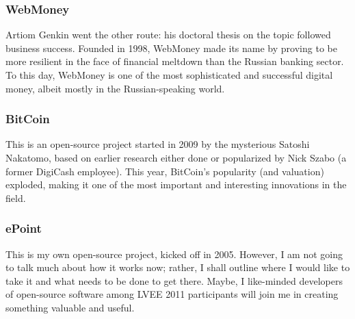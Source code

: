 \documentclass[10pt, a5paper]{article}
\begin{document}
\subsubsection*{WebMoney}
Artiom Genkin went the other route: his doctoral thesis on the topic
followed business success. Founded in 1998, WebMoney made its name by
proving to be more resilient in the face of financial meltdown than the
Russian banking sector. To this day, WebMoney is one of the most
sophisticated and successful digital money, albeit mostly in the
Russian-speaking world.

\subsubsection*{BitCoin}
This is an open-source project started in 2009 by the mysterious Satoshi
Nakatomo, based on earlier research either done or popularized by Nick
Szabo (a former DigiCash employee). This year, BitCoin's popularity (and
valuation) exploded, making it one of the most im\-portant and interesting
innovations in the field.

\subsubsection*{ePoint}
This is my own open-source project, kicked off in 2005. However, I am
not going to talk much about how it works now; rather, I shall outline
where I would like to take it and what needs to be done to get there.
Maybe, I like-minded developers of open-source software among LVEE 2011
participants will join me in creating something valuable and useful.
\end{document}
